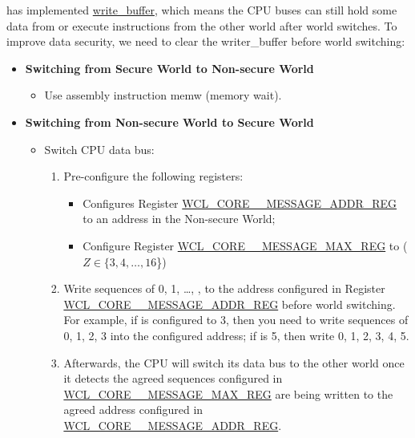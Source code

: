 \documentclass[main\_\_EN.tex]{subfiles}
\begin{document}
\chipname{} has implemented \href{https://en.wikipedia.org/wiki/Write_buffer}{write\_buffer}, which means the CPU buses can still hold some data from or execute instructions from the other world after world switches. To improve data security, we need to clear the writer\_buffer before world switching:
\begin{itemize}
    \item \textbf{Switching from Secure World to Non-secure World}
    \begin{itemize}
        \item Use assembly instruction memw (memory wait).
    \end{itemize}
    \item \textbf{Switching from Non-secure World to Secure World}
    \begin{itemize}
        \item Switch CPU data bus:
        \begin{enumerate}
        \item Pre-configure the following registers:
        \begin{itemize}
            \item Configures Register \hyperref[regdesc:WCLCORE0MESSAGEADDRREG]{WCL\_CORE\_\_MESSAGE\_ADDR\_REG} to an address in the Non-secure World;
        \item Configure Register \hyperref[regdesc:WCLCORE0MESSAGEMAXREG]{WCL\_CORE\_\_MESSAGE\_MAX\_REG} to  (\begin{math} Z \in \{ 3, 4, \dots, 16 \end{math}\})
        \end{itemize}
        \item Write sequences of 0, 1, \dots, ,  to the address configured in Register \\ \hyperref[regdesc:WCLCORE0MESSAGEADDRREG]{WCL\_CORE\_\_MESSAGE\_ADDR\_REG} before world switching. For example, if  is configured to 3, then you need to write sequences of 0, 1, 2, 3 into the configured address; if  is 5, then write  0, 1, 2, 3, 4, 5.
        \item Afterwards, the CPU will switch its data bus to the other world once it detects the agreed sequences configured in \hyperref[regdesc:WCLCORE0MESSAGEMAXREG]{WCL\_CORE\_\_MESSAGE\_MAX\_REG} are being written to the agreed address configured in \hyperref[regdesc:WCLCORE0MESSAGEADDRREG]{WCL\_CORE\_\_MESSAGE\_ADDR\_REG}.
    \end{enumerate}
    \end{itemize}
\end{itemize}
\end{document}
